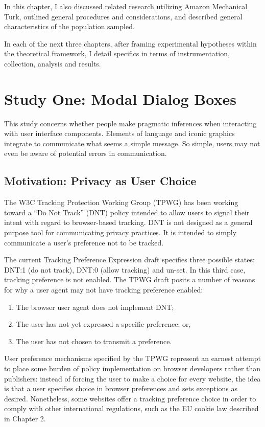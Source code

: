 In this chapter, I also discussed related research utilizing Amazon Mechanical Turk, outlined general procedures and considerations, and described general characteristics of the population sampled.

In each of the next three chapters, after framing experimental hypotheses within the theoretical framework, I detail specifics in terms of instrumentation, collection, analysis and results.

\chapter{Study One: Modal Dialog Boxes}
\label{studyone:modaldialogboxes}

This study concerns whether people make pragmatic inferences when interacting with user interface components. Elements of language and iconic graphics integrate to communicate what seems a simple message. So simple, users may not even be aware of potential errors in communication.

\section{Motivation: Privacy as User Choice}
\label{motivation:privacyasuserchoice}

The W3C Tracking Protection Working Group (TPWG) has been working toward a ``Do Not Track'' (DNT) policy intended to allow users to signal their intent with regard to browser-based tracking. DNT is not designed as a general purpose tool for communicating privacy practices. It is intended to simply communicate a user's preference not to be tracked. 

The current Tracking Preference Expression draft specifies three possible states: DNT:1 (do not track), DNT:0 (allow tracking) and un-set. In this third case, tracking preference is not enabled. The TPWG draft posits a number of reasons for why a user agent may not have tracking preference enabled:
 
\begin{enumerate}
\item The browser user agent does not implement DNT;
\item The user has not yet expressed a specific preference; or,
\item The user has not chosen to transmit a preference.
\end{enumerate}

User preference mechanisms specified by the TPWG represent an earnest attempt to place some burden of policy implementation on browser developers rather than publishers: instead of forcing the user to make a choice for every website, the idea is that a user specifies choice in browser preferences and sets exceptions as desired. Nonetheless, some websites offer a tracking preference choice in order to comply with other international regulations, such as the EU cookie law described in Chapter 2.

